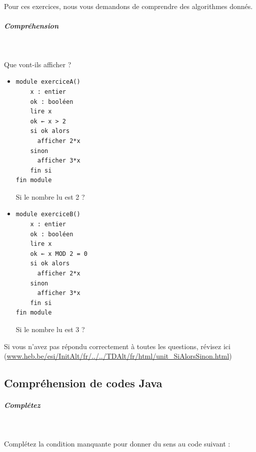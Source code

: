 \documentclass[11pt,a4paper]{article}
\begin{document}
          Pour ces exercices, nous vous demandons de comprendre des algorithmes donn\'es. 
        
            \par
        
			
		\subparagraph{Compr\'ehension} 
		
                \textcolor{white}{.} \par
            
							  Que vont-ils afficher ?
              
					\begin{itemize}
				
			\item \begin{verbatim}
module exerciceA()
    x : entier
    ok : booléen
    lire x
    ok ← x > 2
    si ok alors
      afficher 2*x
    sinon
      afficher 3*x
    fin si
fin module
				\end{verbatim}Si le nombre lu est 2 ? 
            \par
         \textcolor{gray}{\underline{\hspace*{1em}}} 
			\item \begin{verbatim}
module exerciceB()
    x : entier
    ok : booléen
    lire x
    ok ← x MOD 2 = 0
    si ok alors
      afficher 2*x
    sinon
      afficher 3*x
    fin si
fin module
				\end{verbatim}Si le nombre lu est 3 ? 
            \par
         \textcolor{gray}{\underline{\hspace*{1em}}} 
					\end{itemize}
				Si vous n'avez pas r\'epondu correctement \`a toutes les questions, 
        r\'evisez ici (\url{www.heb.be/esi/InitAlt/fr/../../TDAlt/fr/html/unit\_SiAlorsSinon.html})
            \par
        \subsection{Compr\'ehension de codes Java}
			
		\subparagraph{Compl\'etez} 
		
                \textcolor{white}{.} \par
            
								Compl\'etez la condition manquante pour donner du sens au code suivant :
							
            \par
			
\end{document}
